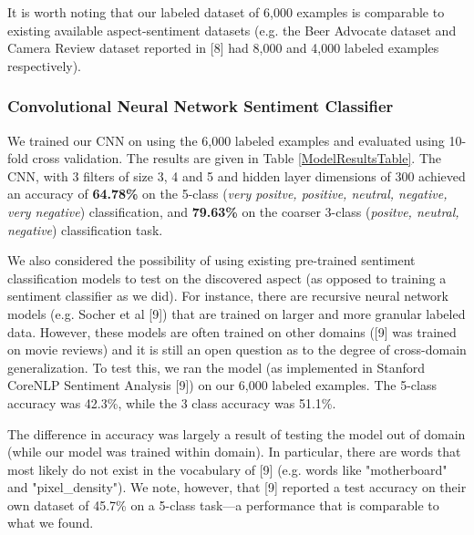 \documentclass{article} %
\begin{document}
It is worth noting that our labeled dataset of 6,000 examples is comparable to existing available aspect-sentiment datasets (e.g. the Beer Advocate dataset and Camera Review dataset reported in [8] had 8,000 and 4,000 labeled examples respectively).


\subsubsection{Convolutional Neural Network Sentiment Classifier}
We trained our CNN on using the 6,000 labeled examples and evaluated using 10-fold cross validation. The results are given in Table \ref{ModelResultsTable}. The CNN, with 3 filters of size 3, 4 and 5 and hidden layer dimensions of 300 achieved an accuracy of \textbf{64.78\%} on the 5-class (\textit{very positve, positive, neutral, negative, very negative}) classification, and \textbf{79.63\%} on the coarser 3-class (\textit{positve, neutral, negative}) classification task.

We also considered the possibility of using existing pre-trained sentiment classification models to test on the discovered aspect (as opposed to training a sentiment classifier as we did). For instance, there are recursive neural network models (e.g. Socher et al [9]) that are trained on larger and more granular labeled data. However, these models are often trained on other domains ([9] was trained on movie reviews) and it is still an open question as to the degree of cross-domain generalization. To test this, we ran the model (as implemented in Stanford CoreNLP Sentiment Analysis [9]) on our 6,000 labeled examples. The 5-class accuracy was 42.3\%, while the 3 class accuracy was 51.1\%.

The difference in accuracy was largely a result of testing the model out of domain (while our model was trained within domain). In particular, there are words that most likely do not exist in the vocabulary of [9] (e.g. words like "motherboard" and "pixel\_density"). We note, however, that [9] reported a test accuracy on their own dataset of 45.7\% on a 5-class task---a performance that is comparable to what we found.
\end{document}
